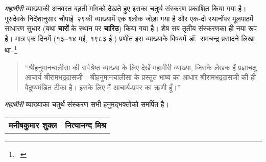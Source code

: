 \begin{sloppypar}\justifying
\textit{महावीरी} व्याख्याकी अनवरत बढ़ती माँगको देखते हुए इसका चतुर्थ संस्करण प्रकाशित किया गया है। गुरुदेवके निर्देशानुसार चौपाई~२९की व्याख्यामें एक श्लोक जोड़ा गया है और एक-दो स्थानोंपर मूलपाठमें साधारण सुधार (यथा \textbf{चारों} के स्थान पर \textbf{चारिउ}) किया गया है। शेष सब तृतीय संस्करणका ही नया रूप है। मात्र एक दिनमें (१३–१४ मई, १९८३ ई.) प्रणीत इस व्याख्याके विषयमें डॉ.~रामचन्द्र प्रसादने लिखा था–\footnote{\ {}}
\end{sloppypar}
\vspace{-1ex}
\begin{quote}
\begin{sloppypar}\justifying
“श्रीहनुमानचालीसा की सर्वश्रेष्ठ व्याख्या के लिए देखें महावीरी व्याख्या, जिसके लेखक हैं प्रज्ञाचक्षु आचार्य श्रीरामभद्रदासजी। श्रीहनुमानचालीसा के प्रस्तुत भाष्य का आधार श्रीरामभद्रदासजी की ही वैदुष्यमंडित टीका है। इसके लिए मैं आचार्य-प्रवर का ऋणी हूँ।”
\end{sloppypar}
\end{quote}
\vspace{-1ex}
\begin{sloppypar}\justifying
\textit{महावीरी} व्याख्याका चतुर्थ संस्करण सभी हनुमद्भक्तोंको समर्पित है।
\end{sloppypar}
\vspace{0.5\baselineskip}
\begin{longtable}{@{}C{0.5\textwidth}@{}@{}C{0.5\textwidth}@{}}
\textbf{मनीषकुमार शुक्ल} & \textbf{नित्यानन्द मिश्र}\\
\end{longtable}
\vspace{0.5\baselineskip}

